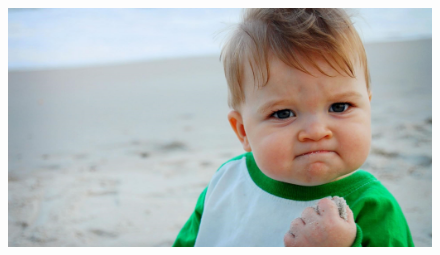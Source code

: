 \documentclass{beamer}
\begin{document}
\begin{frame}{}
	\begin{figure}[htbp]
		\centering
		\includegraphics[width=1.0\textwidth]{images/success}
	\end{figure}
\end{frame}
\end{document}
